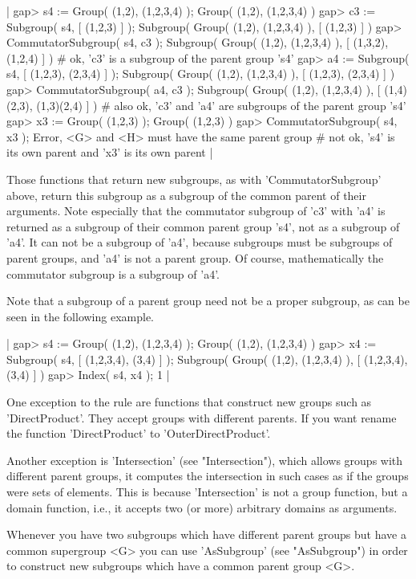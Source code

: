 |    gap> s4 := Group( (1,2), (1,2,3,4) );
    Group( (1,2), (1,2,3,4) )
    gap> c3 := Subgroup( s4, [ (1,2,3) ] );
    Subgroup( Group( (1,2), (1,2,3,4) ), [ (1,2,3) ] )
    gap> CommutatorSubgroup( s4, c3 );
    Subgroup( Group( (1,2), (1,2,3,4) ), [ (1,3,2), (1,2,4) ] )
    # ok, 'c3' is a subgroup of the parent group 's4'
    gap> a4 := Subgroup( s4, [ (1,2,3), (2,3,4) ] );
    Subgroup( Group( (1,2), (1,2,3,4) ), [ (1,2,3), (2,3,4) ] )
    gap> CommutatorSubgroup( a4, c3 );
    Subgroup( Group( (1,2), (1,2,3,4) ), [ (1,4)(2,3), (1,3)(2,4) ] )
    # also ok, 'c3' and 'a4' are subgroups of the parent group 's4'
    gap> x3 := Group( (1,2,3) );
    Group( (1,2,3) )
    gap> CommutatorSubgroup( s4, x3 );
    Error, <G> and <H> must have the same parent group
    # not ok, 's4' is its own parent and 'x3' is its own parent |

Those functions that return  new  subgroups, as  with 'CommutatorSubgroup'
 above,
return  this subgroup  as  a  subgroup  of  the  common  parent  of their
arguments.  Note  especially  that the  commutator subgroup  of 'c3'  with
'a4'  is
returned  as a subgroup  of  their  common parent  group  's4', not as  a
subgroup  of 'a4'.  It  can  not be a subgroup of 'a4', because subgroups
must be  subgroups  of parent groups, and 'a4' is not a parent group.  Of
course, mathematically the commutator subgroup is a subgroup of 'a4'.

Note that a subgroup of a parent group need not be a proper subgroup, as
can be seen in the following example.

|    gap> s4 := Group( (1,2), (1,2,3,4) );
    Group( (1,2), (1,2,3,4) )
    gap> x4 := Subgroup( s4, [ (1,2,3,4), (3,4) ] );
    Subgroup( Group( (1,2), (1,2,3,4) ), [ (1,2,3,4), (3,4) ] )
    gap> Index( s4, x4 );
    1 |

One exception to the rule are functions that construct new groups such as
'DirectProduct'.  They accept groups with different parents.  If you want
rename the function 'DirectProduct' to 'OuterDirectProduct'.

Another  exception is 'Intersection' (see "Intersection"),  which  allows
groups with different parent groups, it computes the intersection in such
cases  as  if  the  groups  were  sets  of  elements.   This  is  because
'Intersection'  is not a  group function, but a domain function, i.e., it
accepts two (or more) arbitrary domains as arguments.

Whenever you have  two subgroups which have different  parent groups  but
have a common supergroup <G> you can use 'AsSubgroup'  (see "AsSubgroup")
in order to construct new subgroups which have a common parent group <G>.

